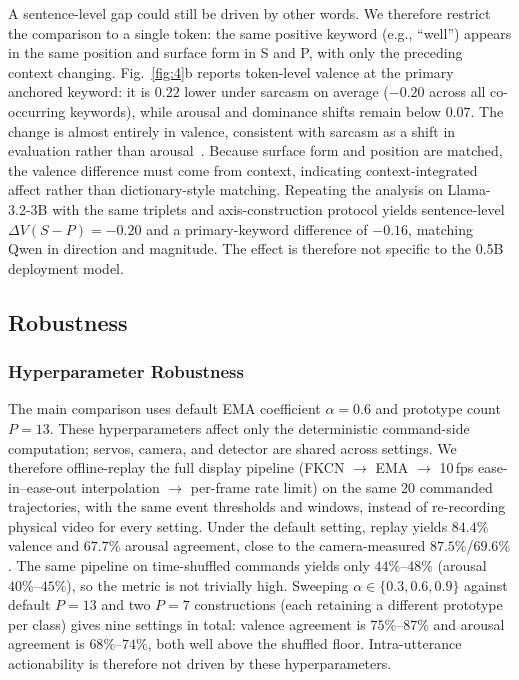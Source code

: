 \documentclass[letterpaper, 10 pt, conference]{ieeeconf/ieeeconf}
\begin{document}
A sentence-level gap could still be driven by other words. We therefore restrict the comparison to a single token: the same positive keyword (e.g., ``well'') appears in the same position and surface form in S and P, with only the preceding context changing. Fig.~\ref{fig:4}b reports token-level valence at the primary anchored keyword: it is $0.22$ lower under sarcasm on average ($-0.20$ across all co-occurring keywords), while arousal and dominance shifts remain below $0.07$. The change is almost entirely in valence, consistent with sarcasm as a shift in evaluation rather than arousal~\cite{leggitt2000emotional}. Because surface form and position are matched, the valence difference must come from context, indicating context-integrated affect rather than dictionary-style matching. Repeating the analysis on Llama-3.2-3B with the same triplets and axis-construction protocol yields sentence-level $\Delta V(S{-}P){=}-0.20$ and a primary-keyword difference of $-0.16$, matching Qwen in direction and magnitude. The effect is therefore not specific to the 0.5B deployment model.


\subsection{Robustness}
\subsubsection{Hyperparameter Robustness}
The main comparison uses default EMA coefficient $\alpha{=}0.6$ and prototype count $P{=}13$. These hyperparameters affect only the deterministic command-side computation; servos, camera, and detector are shared across settings. We therefore offline-replay the full display pipeline (FKCN $\to$ EMA $\to$ 10\,fps ease-in--ease-out interpolation $\to$ per-frame rate limit) on the same 20 commanded trajectories, with the same event thresholds and windows, instead of re-recording physical video for every setting. Under the default setting, replay yields $84.4\%$ valence and $67.7\%$ arousal agreement, close to the camera-measured $87.5\%$/$69.6\%$. The same pipeline on time-shuffled commands yields only $44\%$--$48\%$ (arousal $40\%$--$45\%$), so the metric is not trivially high. Sweeping $\alpha\in\{0.3,0.6,0.9\}$ against default $P{=}13$ and two $P{=}7$ constructions (each retaining a different prototype per class) gives nine settings in total: valence agreement is $75\%$--$87\%$ and arousal agreement is $68\%$--$74\%$, both well above the shuffled floor. Intra-utterance actionability is therefore not driven by these hyperparameters.
\end{document}
